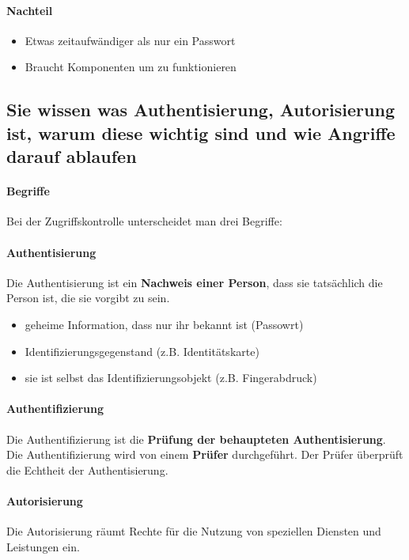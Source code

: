 \documentclass[10pt,a4paper]{article}
\begin{document}
\paragraph*{Nachteil}
\begin{itemize}[noitemsep,topsep=0pt,leftmargin=*]
    \item Etwas zeitaufwändiger als nur ein Passwort
    \item Braucht Komponenten um zu funktionieren
\end{itemize}

\pagebreak
\subsection*{Sie wissen was Authentisierung, Autorisierung ist, warum diese wichtig sind und wie Angriffe darauf ablaufen}
\paragraph*{Begriffe}Bei der Zugriffskontrolle unterscheidet man drei Begriffe:

\paragraph*{Authentisierung}\label{para:Authentisierung}Die Authentisierung ist ein \textbf{Nachweis einer Person}, dass sie tatsächlich die Person ist, die sie vorgibt zu sein.
\begin{itemize}[noitemsep,topsep=0pt,leftmargin=*]
    \item geheime Information, dass nur ihr bekannt ist (Passowrt)
    \item Identifizierungsgegenstand (z.B. Identitätskarte)
    \item sie ist selbst das Identifizierungsobjekt (z.B. Fingerabdruck)
\end{itemize}

\paragraph*{Authentifizierung}\label{para:Authentifizierung}Die Authentifizierung ist die \textbf{Prüfung der behaupteten Authentisierung}. Die Authentifizierung wird von einem \textbf{Prüfer} durchgeführt. Der Prüfer überprüft die Echtheit der Authentisierung.

\paragraph*{Autorisierung}\label{para:Autorisierung}Die Autorisierung räumt Rechte für die Nutzung von speziellen Diensten und Leistungen ein.
\end{document}
